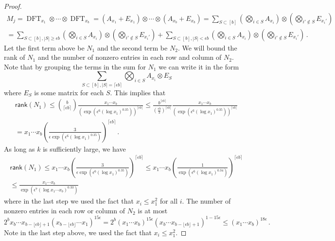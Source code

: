 \documentclass[11pt]{article}
\numberwithin{equation}{section}
\theoremstyle{definition}
\theoremstyle{plain}
\theoremstyle{definition}
\newcommand\rank{\textsf{rank}}
\DeclareMathOperator{\DFT}{DFT}
\begin{document}
\begin{proof}
%
%
%
%
\begin{align*}
M_j = \DFT_{x_1} \otimes \cdots \otimes \DFT_{x_b}   = (A_{x_1} + E_{x_1}) \otimes \cdots \otimes (A_{x_b} + E_{x_b}) = \sum_{S \subset [b]}\left(\bigotimes_{i \in S}A_{x_i}\right) \otimes \left(\bigotimes_{i' \notin S}E_{x_i'}\right) \\ = \sum_{S \subset [b], |S| \geq \epsilon b}\left(\bigotimes_{i \in S}A_{x_i}\right)\otimes \left(\bigotimes_{i' \notin S}E_{x_i'} \right)+ \sum_{S \subset [b], |S| < \epsilon b}\left(\bigotimes_{i \in S}A_{x_i}\right)\otimes \left(\bigotimes_{i' \notin S}E_{x_i'} \right) \,.
\end{align*}
%
Let the first term above be $N_1$ and the second term be $N_2$.  We will bound the rank of $N_1$ and the number of nonzero entries in each row and column of $N_2$. Note that by grouping the terms in the sum for $N_1$ we can write it in the form
\[
\sum_{S \subset [b], |S| = \lceil \epsilon b \rceil}\bigotimes_{i \in S}A_{x_i} \otimes E_S
\]
where %
$E_S$ is some matrix for each $S$. %
%
 This implies that 
\begin{align*}
\rank(N_1) \leq \binom{b}{\lceil \epsilon b \rceil} \frac{x_1 \cdots x_b}{\left(\exp\left(\epsilon^6 (\log x_1)^{0.35}\right)\right)^{\lceil \epsilon b \rceil}} \leq \frac{b^{\lceil \epsilon b \rceil}}{( \frac{\epsilon b}{3})^{\lceil \epsilon b \rceil}}\frac{x_1 \cdots x_b}{\left(\exp\left(\epsilon^6 (\log x_1)^{0.35}\right)\right)^{\lceil \epsilon b \rceil}} \\ = x_1 \cdots x_b\left( \frac{3}{\epsilon \exp\left(\epsilon^6 (\log x_1)^{0.35}\right)} \right)^{\lceil \epsilon b \rceil} \,.
\end{align*}
As long as $k$ is sufficiently large, we have
%
\begin{eqnarray*}
\rank(N_1) \leq x_1 \cdots x_b\left( \frac{3}{\epsilon \exp\left(\epsilon^6 (\log x_1)^{0.35}\right)} \right)^{\lceil \epsilon b \rceil} \leq x_1 \cdots x_b\left( \frac{1}{\exp\left(\epsilon^6 (\log x_1)^{0.34}\right)} \right)^{\lceil \epsilon b \rceil}  \\ \leq \frac{ x_1 \cdots x_b}{\exp\left(\epsilon^7 (\log x_1 \cdots x_b )^{0.33}\right)}
\end{eqnarray*}
where in the last step we used the fact that $x_i \leq x_1^2$ for all $i$.  The number of nonzero entries in each row or column of $N_2$ is at most 
\[
2^b x_b \cdots x_{b - \lfloor \epsilon b\rfloor + 1}(x_{b - \lfloor \epsilon b\rfloor} \cdots x_1)^{15\epsilon} = 2^b (x_1 \cdots x_b)^{15\epsilon}(x_b \cdots x_{b - \lfloor \epsilon b\rfloor + 1})^{1 - 15\epsilon} \leq (x_1 \cdots x_b)^{18\epsilon} \,.
\]
Note in the last step above, we used the fact that $x_i \leq x_1^2$.


\end{proof}
\end{document}

